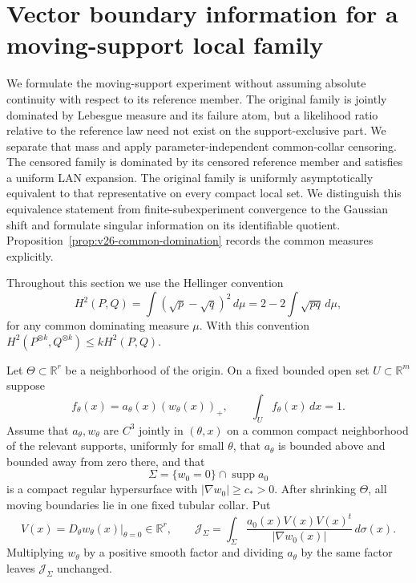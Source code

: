 \section{Vector boundary information for a moving-support local family}
\label{sec:v22-vector-information}

We formulate the moving-support experiment without assuming absolute
continuity with respect to its reference member.  The original family is
jointly dominated by Lebesgue measure and its failure atom, but a likelihood
ratio relative to the reference law need not exist on the support-exclusive
part.  We separate that mass and apply parameter-independent common-collar
censoring.  The censored family is dominated by its censored reference member
and satisfies a uniform LAN expansion.  The original family is uniformly
asymptotically equivalent to that representative on every compact local set.
We distinguish this equivalence statement from finite-subexperiment
convergence to the Gaussian shift and formulate singular information on its
identifiable quotient.  Proposition~\ref{prop:v26-common-domination} records
the common measures explicitly.

Throughout this section we use the Hellinger convention
\begin{equation}\label{eq:v22-hellinger-convention}
 H^2(P,Q)=\int(\sqrt p-\sqrt q)^2\,d\mu
        =2-2\int\sqrt{pq}\,d\mu,
\end{equation}
for any common dominating measure $\mu$.  With this convention
$H^2(P^{\otimes k},Q^{\otimes k})\le kH^2(P,Q)$.

Let $\Theta\subset\mathbb R^r$ be a neighborhood of the origin.  On a fixed
bounded open set $U\subset\mathbb R^m$ suppose
\begin{equation}\label{eq:v22-vector-density}
 f_\theta(x)=a_\theta(x)(w_\theta(x))_+,
 \qquad \int_U f_\theta(x)\,dx=1.
\end{equation}
Assume that $a_\theta,w_\theta$ are $C^3$ jointly in $(\theta,x)$ on a
common compact neighborhood of the relevant supports, uniformly for small
$\theta$, that $a_\theta$ is bounded above and bounded away from zero there,
and that
\[
 \Sigma=\{w_0=0\}\cap\operatorname{supp}a_0
\]
is a compact regular hypersurface with $|\nabla w_0|\ge c_*>0$.  After
shrinking $\Theta$, all moving boundaries lie in one fixed tubular collar.
Put
\begin{equation}\label{eq:v22-boundary-velocity-matrix}
 V(x)=D_\theta w_\theta(x)|_{\theta=0}\in\mathbb R^r,
 \qquad
 \mathcal J_\Sigma=
 \int_\Sigma\frac{a_0(x)V(x)V(x)^t}{|\nabla w_0(x)|}\,d\sigma(x).
\end{equation}
Multiplying $w_\theta$ by a positive smooth factor and dividing
$a_\theta$ by the same factor leaves $\mathcal J_\Sigma$ unchanged.

